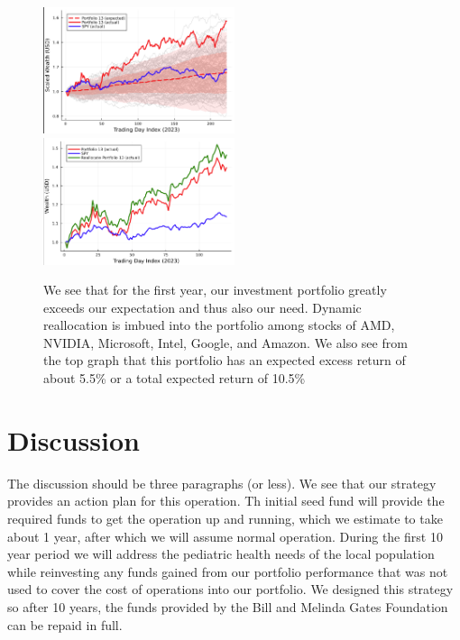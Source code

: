 \documentclass[10pt,twocolumn,twoside,final]{IEEEtran}
\begin{document}
\begin{figure}[!h]\centering
\includegraphics[width=0.5\textwidth]{./figs/year1expected.png}
\includegraphics[width=0.5\textwidth]{./figs/year1reallocated.png}
\caption{We see that for the first year, our investment portfolio greatly exceeds our expectation and thus also our need. Dynamic reallocation is imbued into the portfolio among stocks of AMD, NVIDIA, Microsoft, Intel, Google, and Amazon. We also see from the top graph that this portfolio has an expected excess return of about 5.5\% or a total expected return of 10.5\%}
\end{figure}

\section{Discussion}
The discussion should be three paragraphs (or less). 
We see that our strategy provides an action plan for this operation. Th initial seed fund will provide the required funds to get the operation up and running, which we estimate to take about 1 year, after which we will assume normal operation. During the first 10 year period we will address the pediatric health needs of the local population while reinvesting any funds gained from our portfolio performance that was not used to cover the cost of operations into our portfolio. We designed this strategy so after 10 years, the funds provided by the Bill and Melinda Gates Foundation can be repaid in full. 
\end{document}
